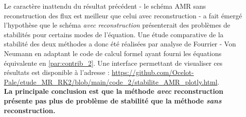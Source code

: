 \label{par:stab_amr}
Le caractère inattendu du résultat précédent - le schéma AMR sans reconstruction des flux est meilleur que celui avec reconstruction - a fait émergé l'hypothèse 
que le schéma \textit{avec reconstruction} présenterait des problèmes de stabilités pour certains modes de l'équation.
Une étude comparative de la stabilité des deux méthodes a donc été réalisées par analyse de Fourrier - Von Neumann en adaptant le code de calcul formel ayant fourni les équations équivalente en \ref{par:contrib_2}.
Une interface permettant de visualiser ces résultats est disponible à l'adresse : \href{https://github.com/Ocelot-Pale/etude\_MR\_RK2/blob/main/code\_2/stabilite\_AMR\_plotly.html}{https://github.com/Ocelot-Pale/etude\_MR\_RK2/blob/main/code\_2/stabilite\_AMR\_plotly.html}.\\
\textbf{La principale conclusion est que la méthode \textit{avec} reconstruction présente pas plus de problème de stabilité que la méthode \textit{sans} reconstruction.}
